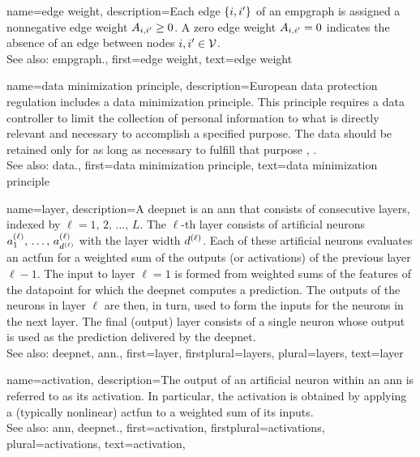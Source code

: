 {name={edge weight},
	description={Each edge $\{i,i'\}$ of an \gls{empgraph} is 
		assigned a nonnegative edge weight $A_{i,i'}\geq0$. 
		A zero edge weight $A_{i,i'}=0$ indicates the absence 
		of an edge between nodes $i, i' \in \mathcal{V}$.
				\\
		See also: \gls{empgraph}.}, 
	first={edge weight},
	text={edge weight}
}


{name={data minimization principle},
	description={European \gls{data} protection regulation 
		includes a \gls{data} minimization principle. This principle requires a \gls{data} controller to 
		limit the collection of personal information to what is directly relevant and necessary 
		to accomplish a specified purpose. The \gls{data} should be retained only for as long as 
		necessary to fulfill that purpose \cite[Article 5(1)(c)]{GDPR2016}, \cite{EURegulation2018}.
				\\
		See also: \gls{data}.}, 
	first={data minimization principle},
	text={data minimization principle}
}

{name={layer},
	description={A \gls{deepnet} is an \gls{ann} that consists of consecutive 
	    layers, indexed by $\ell=1,\,2,\,\ldots,\,L$. The $\ell$-th layer consists of 
		artificial neurons $a^{(\ell)}_{1},\,\ldots,\,a^{(\ell)}_{d^{(\ell)}}$ with 
		the layer width $d^{(\ell)}$. Each of these artificial neurons evaluates 
		an \gls{actfun} for a weighted sum of the outputs (or \glspl{activation}) of the 
		previous layer $\ell-1$. The input to layer $\ell=1$ is formed from weighted sums 
		of the \glspl{feature} of the \gls{datapoint} for which the \gls{deepnet} computes 
		a \gls{prediction}. The outputs of the neurons in layer $\ell$ are then, in turn, 
		used to form the inputs for the neurons in the next layer. The final (output) layer 
		consists of a single neuron whose 
		output is used as the \gls{prediction} delivered by the \gls{deepnet}.  
		\\
		See also: \gls{deepnet}, \gls{ann}.}, 
	first={layer},
	firstplural={layers},
	plural={layers}, 
	text={layer}
}


{name={activation},
	description={The output  of an artificial neuron within an \gls{ann} is referred 
		to as its activation. In particular, the activation is obtained by applying a (typically nonlinear) \gls{actfun} 
		to a weighted sum of its inputs.
		\\
		See also: \gls{ann}, \gls{deepnet}.}, 
	first={activation},
	firstplural={activations},
	plural={activations}, 
	text={activation}, 
}

